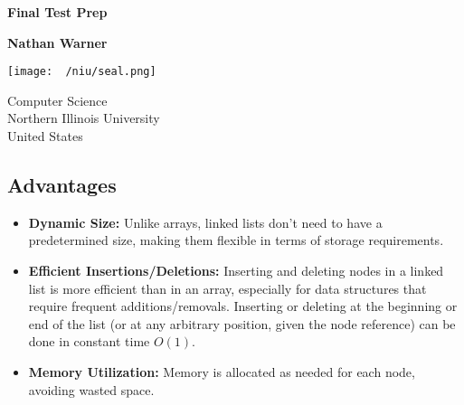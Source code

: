 \documentclass{report}
\title{\Huge{}}
\author{\huge{Nathan Warner}}
\date{\huge{}}
\begin{document}
        \begin{titlepage}
       \begin{center}
           \vspace*{1cm}
    
           \textbf{Final Test Prep}
    
           \vspace{0.5cm}
            
                
           \vspace{1.5cm}
    
           \textbf{Nathan Warner}
    
           \vfill
                
                
           \vspace{0.8cm}
         
           \texttt{[image: ~/niu/seal.png]}
                
           Computer Science \\
           Northern Illinois University\\
           United States\\
           
                
       \end{center}
    \end{titlepage}
    \tableofcontents
    \pagebreak 
    \bigbreak \noindent 
    \subsection{Advantages}
    \bigbreak \noindent 
    \begin{itemize}
        \item \textbf{Dynamic Size:} Unlike arrays, linked lists don't need to have a predetermined size, making them flexible in terms of storage requirements.
        \item \textbf{Efficient Insertions/Deletions:} Inserting and deleting nodes in a linked list is more efficient than in an array, especially for data structures that require frequent additions/removals. Inserting or deleting at the beginning or end of the list (or at any arbitrary position, given the node reference) can be done in constant time $O(1)$.
        \item \textbf{Memory Utilization:} Memory is allocated as needed for each node, avoiding wasted space.
    \end{itemize}
\end{document}

